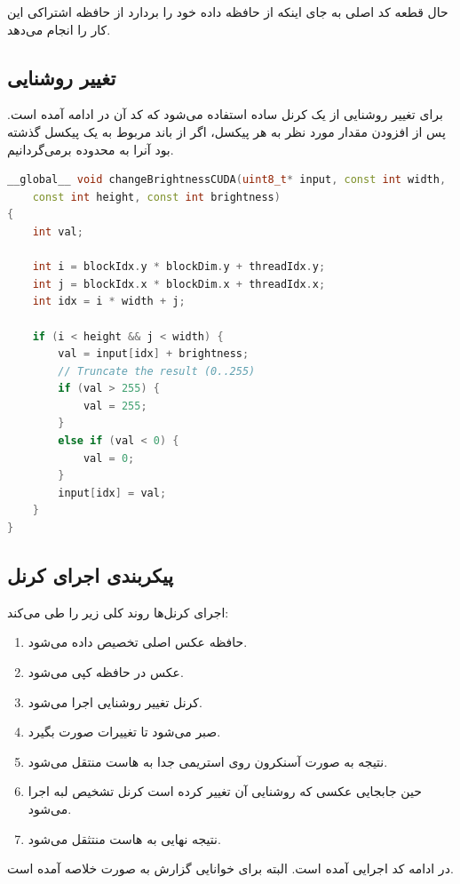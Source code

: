\documentclass{article}
\begin{document}
حال قطعه کد اصلی به جای اینکه از حافظه داده خود را بردارد از حافظه اشتراکی این کار را انجام می‌دهد.

\subsection{تغییر روشنایی}
برای تغییر روشنایی از یک کرنل ساده استفاده می‌شود که کد آن در ادامه آمده است. پس از افزودن مقدار مورد نظر به هر پیکسل، اگر از باند مربوط به یک پیکسل گذشته بود آنرا به محدوده برمی‌گردانیم.

\begin{latin}
\begin{lstlisting}[language=C++]
__global__ void changeBrightnessCUDA(uint8_t* input, const int width, 
    const int height, const int brightness)
{
    int val;

    int i = blockIdx.y * blockDim.y + threadIdx.y;
    int j = blockIdx.x * blockDim.x + threadIdx.x;
    int idx = i * width + j;

    if (i < height && j < width) {
        val = input[idx] + brightness;
        // Truncate the result (0..255)
        if (val > 255) {
            val = 255;
        }
        else if (val < 0) {
            val = 0;
        }
        input[idx] = val;
    }
}
\end{lstlisting}
\end{latin}


\subsection{پیکربندی اجرای کرنل}
اجرای کرنل‌ها روند کلی زیر را طی می‌کند:
\begin{enumerate}
	\item حافظه عکس اصلی تخصیص داده می‌شود.
	\item عکس در حافظه کپی می‌شود.
	\item کرنل تغییر روشنایی اجرا می‌شود.
	\item صبر می‌شود تا تغییرات صورت بگیرد.
	\item نتیجه به صورت آسنکرون روی استریمی جدا به هاست منتقل می‌شود.
	\item حین جابجایی عکسی که روشنایی آن تغییر کرده است کرنل تشخیص لبه اجرا می‌شود.
	\item نتیجه نهایی به هاست منتثقل می‌شود.
\end{enumerate}

در ادامه کد اجرایی آمده است. البته برای خوانایی گزارش به صورت خلاصه‌ آمده است.
\end{document}

